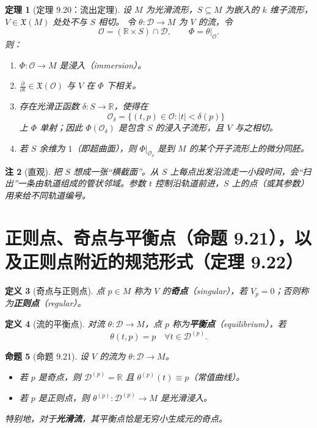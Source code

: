 \documentclass[11pt]{article}
\newtheorem{definition}{定义}[section]
\newtheorem{theorem}[definition]{定理}
\newtheorem{proposition}[definition]{命题}
\newtheorem{remark}[definition]{注}
\newcommand{\R}{\mathbb{R}}
\newcommand{\D}{\mathcal{D}}
\newcommand{\X}{\mathfrak{X}}
\begin{document}
\begin{theorem}[定理 9.20：流出定理]
设 $M$ 为光滑流形，$S\subseteq M$ 为嵌入的 $k$ 维子流形，$V\in\X(M)$ 处处不与 $S$ 相切。
令 $\theta:\D\to M$ 为 $V$ 的流，令
\[
\mathcal O=(\R\times S)\cap\D,\qquad \Phi=\theta|_{\mathcal O}.
\]
则：
\begin{enumerate}[label=(\alph*)]
\item $\Phi:\mathcal O\to M$ 是浸入（immersion）。
\item $\frac{\partial}{\partial t}\in\X(\mathcal O)$ 与 $V$ 在 $\Phi$ 下相关。
\item 存在光滑正函数 $\delta:S\to\R$，使得在
\[
\mathcal O_\delta=\{(t,p)\in\mathcal O:|t|<\delta(p)\} \tag{9.9}
\]
上 $\Phi$ 单射；因此 $\Phi(\mathcal O_\delta)$ 是包含 $S$ 的浸入子流形，且 $V$ 与之相切。
\item 若 $S$ 余维为 $1$（即超曲面），则 $\Phi|_{\mathcal O_\delta}$ 是到 $M$ 的某个开子流形上的微分同胚。
\end{enumerate}
\end{theorem}

\begin{remark}[直观]
把 $S$ 想成一张“横截面”。从 $S$ 上每点出发沿流走一小段时间，会“扫出”一条由轨道组成的管状邻域。参数 $t$ 控制沿轨道前进，$S$ 上的点（或其参数）用来给不同轨道编号。
\end{remark}

\section{正则点、奇点与平衡点（命题 9.21），以及正则点附近的规范形式（定理 9.22）}

\begin{definition}[奇点与正则点]
点 $p\in M$ 称为 $V$ 的\textbf{奇点}（singular），若 $V_p=0$；否则称为\textbf{正则点}（regular）。
\end{definition}

\begin{definition}[流的平衡点]
对流 $\theta:\D\to M$，点 $p$ 称为\textbf{平衡点}（equilibrium），若
\[
\theta(t,p)=p\quad \forall t\in\D^{(p)}.
\]
\end{definition}

\begin{proposition}[命题 9.21]
设 $V$ 的流为 $\theta:\D\to M$。
\begin{itemize}
\item 若 $p$ 是奇点，则 $\D^{(p)}=\R$ 且 $\theta^{(p)}(t)\equiv p$（常值曲线）。
\item 若 $p$ 是正则点，则 $\theta^{(p)}:\D^{(p)}\to M$ 是光滑浸入。
\end{itemize}
特别地，对于\textbf{光滑流}，其平衡点恰是无穷小生成元的奇点。
\end{proposition}
\end{document}
